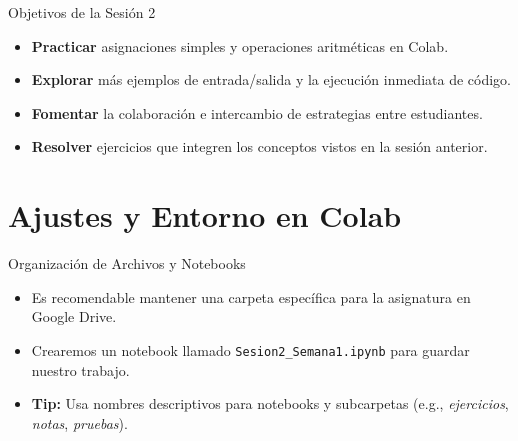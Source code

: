 \documentclass[10pt]{beamer}
\begin{document}
\begin{frame}{Objetivos de la Sesión 2}
  \begin{itemize}
    \item \textbf{Practicar} asignaciones simples y operaciones aritméticas en Colab.
    \item \textbf{Explorar} más ejemplos de entrada/salida y la ejecución inmediata de código.
    \item \textbf{Fomentar} la colaboración e intercambio de estrategias entre estudiantes.
    \item \textbf{Resolver} ejercicios que integren los conceptos vistos en la sesión anterior.
  \end{itemize}
\end{frame}

\section{Ajustes y Entorno en Colab}

\begin{frame}{Organización de Archivos y Notebooks}
  \begin{itemize}
    \item Es recomendable mantener una carpeta específica para la asignatura en Google Drive.
    \item Crearemos un notebook llamado \texttt{Sesion2\_Semana1.ipynb} para guardar nuestro trabajo.
    \item \textbf{Tip:} Usa nombres descriptivos para notebooks y subcarpetas (e.g., \emph{ejercicios}, \emph{notas}, \emph{pruebas}).
  \end{itemize}
\end{frame}
\end{document}
